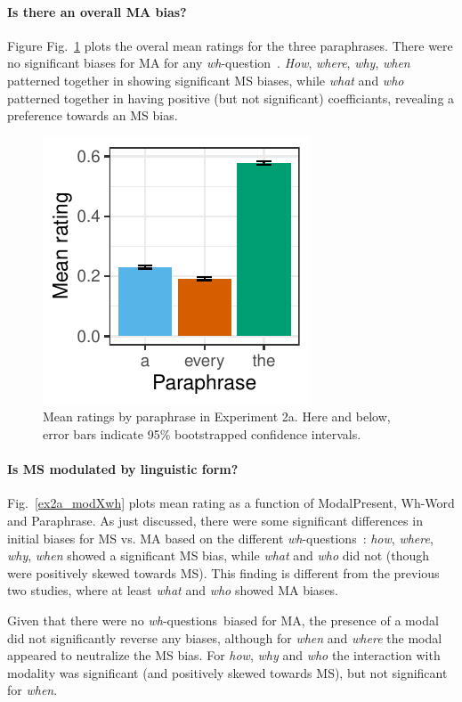 \documentclass[12pt,letterpaper,table,svgnames,dvipsnames]{article}
\newcommand{\figref}[1]{Fig.~\ref{#1}}
\newcommand{\whq}{\emph{wh}-question~}
\newcommand{\whqs}{\emph{wh}-questions~}
\begin{document}
\paragraph{Is there an overall MA bias?}

Figure \figref{ex2a_overall} plots the overal mean ratings for the three paraphrases. There were no significant biases for MA for any \whq. \emph{How}, \emph{where}, \emph{why}, \emph{when} patterned together in showing significant MS biases, while \emph{what} and \emph{who} patterned together in having positive (but not significant) coefficiants, revealing a preference towards an MS bias.
\begin{figure}[h!]
\centering
\includegraphics[scale=1]{figures/overall_nocontext_root.pdf}
\caption{Mean ratings by paraphrase in Experiment 2a. Here and below, error bars indicate 95\% bootstrapped confidence intervals.}
\label{ex2a_overall}
\end{figure}


\paragraph{Is MS modulated by linguistic form?}
\figref{ex2a_modXwh} plots mean rating as a function of ModalPresent, Wh-Word and Paraphrase. As just discussed, there were some significant differences in initial biases for MS vs. MA based on the different \whqs: \emph{how}, \emph{where}, \emph{why}, \emph{when} showed a significant MS bias, while \emph{what} and \emph{who} did not (though were positively skewed towards MS). This finding is different from the previous two studies, where at least \emph{what} and \emph{who} showed MA biases.

Given that there were no \whqs biased for MA, the presence of a modal did not significantly reverse any biases, although for \emph{when} and \emph{where} the modal appeared to neutralize the MS bias. For \emph{how}, \emph{why} and \emph{who} the interaction with modality was significant (and positively skewed towards MS), but not significant for \emph{when}.
\end{document}

